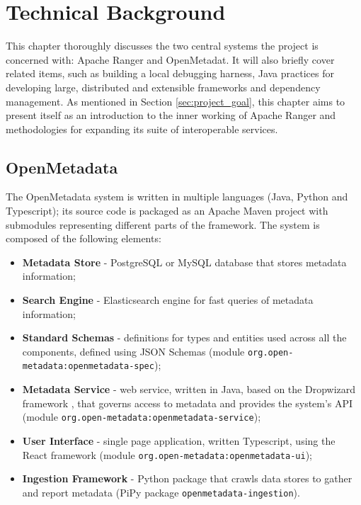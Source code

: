 \chapter{\label{cha:context} Technical Background}

This chapter thoroughly discusses the two central systems the project is concerned with: Apache Ranger and OpenMetadat. It will also briefly cover related items, such as building a local debugging harness, Java practices for developing large, distributed and extensible frameworks and dependency management. As mentioned in Section \ref{sec:project_goal}, this chapter aims to present itself as an introduction to the inner working of Apache Ranger and methodologies for expanding its suite of interoperable services.  

\section{OpenMetadata}

The OpenMetadata system is written in multiple languages (Java, Python and Typescript); its source code is packaged as an Apache Maven project with submodules representing different parts of the framework. The system is composed of the following elements:

\begin{itemize}
    \item \textbf{Metadata Store} - PostgreSQL or MySQL database that stores metadata information;
    \item \textbf{Search Engine} - Elasticsearch engine for fast queries of metadata information;
    \item \textbf{Standard Schemas} - definitions for types and entities used across all the components, defined using JSON Schemas \cite{foundationOfJsonSchemaPezoa2016} (module \texttt{org.open-metadata:openmetadata-spec});  
    \item \textbf{Metadata Service} - web service, written in Java, based on the Dropwizard framework \cite{dropwizardTech}, that governs access to metadata and provides the system's API (module \texttt{org.open-metadata:openmetadata-service});
    \item \textbf{User Interface} - single page application, written Typescript, using the React framework \cite{reactTech} (module \texttt{org.open-metadata:openmetadata-ui});
    \item \textbf{Ingestion Framework} - Python package that crawls data stores to gather and report metadata (PiPy package \texttt{openmetadata-ingestion}).
\end{itemize}

